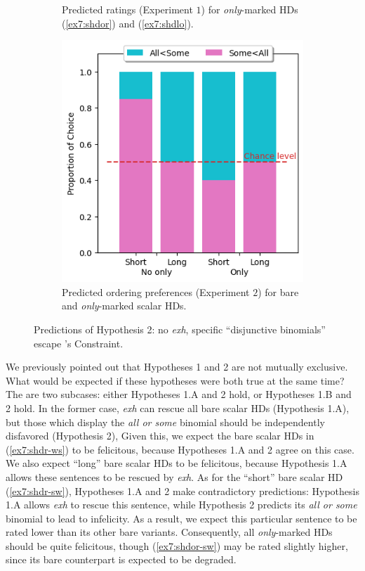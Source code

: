 \begin{figure}[H]
\begin{subfigure}[t]{.32\linewidth}
		\caption[]{Predicted ratings (Experiment $1$) for \textit{only}-marked HDs (\ref{ex7:shdor}) and (\ref{ex7:shdlo}).}
	\end{subfigure}
	\hfill
	\begin{subfigure}[t]{.32\linewidth}
		\centering
		\includegraphics[width=\linewidth]{./images/pred-2-pref.png}
		\caption[]{Predicted ordering preferences (Experiment $2$) for bare and \textit{only}-marked scalar HDs.}
	\end{subfigure}
	\caption[]{Predictions of Hypothesis 2: no \textit{exh}, specific ``disjunctive binomials'' escape \citeauthor{Hurford1974}'s Constraint.}\label{fig7:predictions-freq}
\end{figure} 

We previously pointed out that Hypotheses 1 and 2 are not mutually exclusive. What would be expected if these hypotheses were both true at the same time? The are two subcases: either Hypotheses 1.A and 2 hold, or Hypotheses 1.B and 2 hold. In the former case, \textit{exh} can rescue all bare scalar HDs (Hypothesis 1.A), but those which display the \textit{all or some} binomial should be independently disfavored (Hypothesis 2), Given this, we expect the bare scalar HDs in (\ref{ex7:shdr-ws}) to be felicitous, because Hypotheses 1.A and 2 agree on this case. We also expect ``long'' bare scalar HDs to be felicitous, because Hypothesis 1.A allows these sentences to be rescued by \textit{exh}. As for the ``short'' bare scalar HD (\ref{ex7:shdr-sw}), Hypotheses 1.A and 2 make contradictory predictions: Hypothesis 1.A allows \textit{exh} to rescue this sentence, while Hypothesis 2 predicts its \textit{all or some} binomial to lead to infelicity. As a result, we expect this particular sentence to be rated lower than its other bare variants. Consequently, all \textit{only}-marked HDs should be quite felicitous, though (\ref{ex7:shdor-sw}) may be rated slightly higher, since its bare counterpart is expected to be degraded. 

